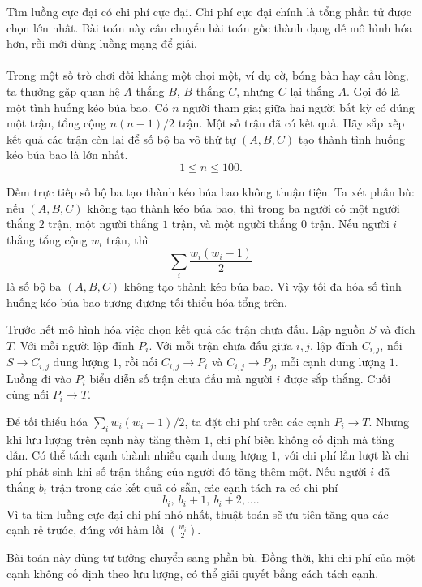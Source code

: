 \documentclass[11pt]{article}
\begin{document}
Tìm luồng cực đại có chi phí cực đại. Chi phí cực đại chính là tổng phần tử
được chọn lớn nhất. Bài toán này cần chuyển bài toán gốc thành dạng dễ mô
hình hóa hơn, rồi mới dùng luồng mạng để giải.

\paragraph{}
Trong một số trò chơi đối kháng một chọi một, ví dụ cờ, bóng bàn hay cầu
lông, ta thường gặp quan hệ \(A\) thắng \(B\), \(B\) thắng \(C\), nhưng \(C\)
lại thắng \(A\). Gọi đó là một tình huống kéo búa bao. Có \(n\) người tham
gia; giữa hai người bất kỳ có đúng một trận, tổng cộng \(n(n-1)/2\) trận. Một
số trận đã có kết quả. Hãy sắp xếp kết quả các trận còn lại để số bộ ba vô
thứ tự \((A,B,C)\) tạo thành tình huống kéo búa bao là lớn nhất.
\[
  1\le n\le 100.
\]

Đếm trực tiếp số bộ ba tạo thành kéo búa bao không thuận tiện. Ta xét phần
bù: nếu \((A,B,C)\) không tạo thành kéo búa bao, thì trong ba người có một
người thắng \(2\) trận, một người thắng \(1\) trận, và một người thắng \(0\)
trận. Nếu người \(i\) thắng tổng cộng \(w_i\) trận, thì
\[
  \sum_i \frac{w_i(w_i-1)}{2}
\]
là số bộ ba \((A,B,C)\) không tạo thành kéo búa bao. Vì vậy tối đa hóa số tình
huống kéo búa bao tương đương tối thiểu hóa tổng trên.

Trước hết mô hình hóa việc chọn kết quả các trận chưa đấu. Lập nguồn \(S\) và
đích \(T\). Với mỗi người lập đỉnh \(P_i\). Với mỗi trận chưa đấu giữa
\(i,j\), lập đỉnh \(C_{i,j}\), nối \(S\to C_{i,j}\) dung lượng \(1\), rồi nối
\(C_{i,j}\to P_i\) và \(C_{i,j}\to P_j\), mỗi cạnh dung lượng \(1\). Luồng đi
vào \(P_i\) biểu diễn số trận chưa đấu mà người \(i\) được sắp thắng. Cuối
cùng nối \(P_i\to T\).

Để tối thiểu hóa \(\sum_i w_i(w_i-1)/2\), ta đặt chi phí trên các cạnh
\(P_i\to T\). Nhưng khi lưu lượng trên cạnh này tăng thêm \(1\), chi phí biên
không cố định mà tăng dần. Có thể tách cạnh thành nhiều cạnh dung lượng \(1\),
với chi phí lần lượt là chi phí phát sinh khi số trận thắng của người đó tăng
thêm một. Nếu người \(i\) đã thắng \(b_i\) trận trong các kết quả có sẵn, các
cạnh tách ra có chi phí
\[
  b_i,\ b_i+1,\ b_i+2,\ldots.
\]
Vì ta tìm luồng cực đại chi phí nhỏ nhất, thuật toán sẽ ưu tiên tăng qua các
cạnh rẻ trước, đúng với hàm lồi \(\binom{w_i}{2}\).

Bài toán này dùng tư tưởng chuyển sang phần bù. Đồng thời, khi chi phí của
một cạnh không cố định theo lưu lượng, có thể giải quyết bằng cách tách cạnh.
\end{document}
